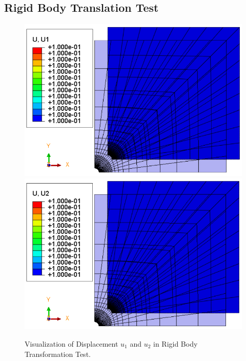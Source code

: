 \documentclass[12pt]{article}
\begin{document}
\subsection{Rigid Body Translation Test}
\vspace{1cm}
\begin{figure}[H]
	\begin{center}
		\includegraphics[scale=0.49]{Rigid_body_u1_crop.png} 
	    \includegraphics[scale=0.49]{Rigid_body_u2_crop.png} 
	\end{center}
	\caption{Visualization of Displacement $u_1 $ and $u_2 $ in Rigid Body Transformation Test.} 
\end{figure}
\vspace{1cm}
\end{document}
